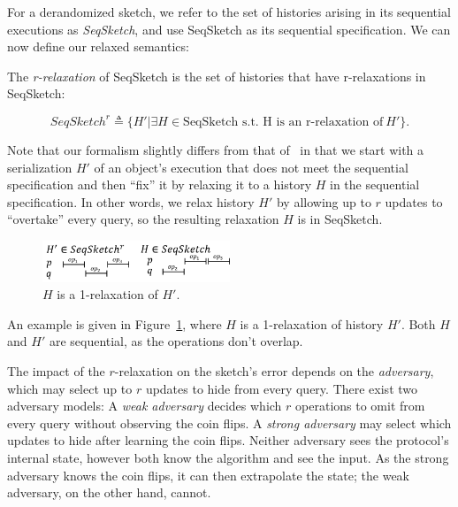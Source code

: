 For a derandomized sketch, we refer to the set of histories arising in its sequential
executions as \emph{SeqSketch}, and use SeqSketch as its sequential specification.
We can now define our relaxed semantics:
\begin{definition}[r-relaxation]
The \emph{r-relaxation} of SeqSketch is the set of histories that have r-relaxations in SeqSketch:
  
\[ SeqSketch^r \triangleq \{H'|\exists H\in \textrm{SeqSketch s.t. H is an r-relaxation of}\ H'\}.\]

\label{fc-def:r-relaxtion}
\end{definition}

Note that our formalism slightly differs from that of~\cite{Henzinger} in that we start with a serialization $H'$ of an object’s
execution that does not meet the sequential specification and then ``fix'' it by relaxing it to a history $H$ in the sequential
specification. In other words, we relax history $H'$ by allowing up to $r$ updates to ``overtake'' every query, so the
resulting relaxation $H$ is in SeqSketch.
\begin{figure}[ht]
    \begin{center}
      \includegraphics[width=0.5\textwidth]{graphics/fast-concurrent/relaxationExample}
    \end{center}
    \caption{$H$ is a 1-relaxation of $H'$.}
    \label{fc-fig:relaxationExample}
\end{figure}

An example is given in Figure~\ref{fc-fig:relaxationExample}, where $H$ is a 1-relaxation of history $H'$.
Both $H$ and $H'$ are sequential, as the operations don't overlap.

The impact of the $r$-relaxation on the sketch's error depends on the \emph{adversary}, which may select up to 
$r$ updates to hide from every query. There exist two adversary models:   
A \emph{weak adversary} decides which $r$ operations to omit from 
every query without observing the coin flips. 
A \emph{strong adversary} may select which updates to hide after learning 
the coin flips. Neither adversary sees the protocol's internal state, however both know the algorithm
and see the input. As the strong adversary knows the coin flips, it can then extrapolate the state; the
weak adversary, on the other hand, cannot.


